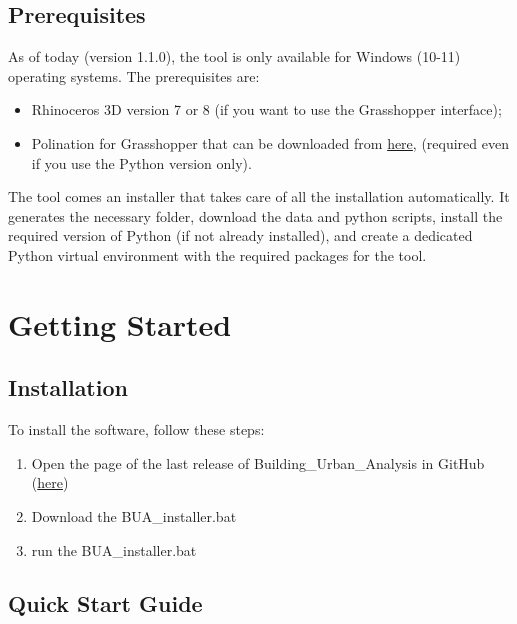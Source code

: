 \documentclass[a4paper,12pt]{article} %
\begin{document}
    \subsection{Prerequisites}
    As of today (version 1.1.0), the tool is only available for Windows (10-11) operating systems.
    The prerequisites are:
    \begin{itemize}
        \item Rhinoceros 3D version 7 or 8 (if you want to use the Grasshopper interface);
        \item Polination for Grasshopper that can be downloaded from \href{https://www.pollination.cloud/grasshopper-plugin}{here}, (required even if you use the Python version only).
    \end{itemize}
    The tool comes an installer that takes care of all the installation automatically.
    It generates the necessary folder, download the data and python scripts, install the required version of Python (if not already installed), and create a dedicated Python virtual environment with the required packages for the tool.

\section{Getting Started}

    \subsection{Installation}
    To install the software, follow these steps:
    \begin{enumerate}
    \item Open the page of the last release of Building\_Urban\_Analysis in GitHub (\href{https://github.com/Eliewiii/Building_Urban_Analysis}{here})
    \item Download the BUA\_installer.bat
    \item run the BUA\_installer.bat
    \end{enumerate}


    \subsection{Quick Start Guide}
\end{document}
